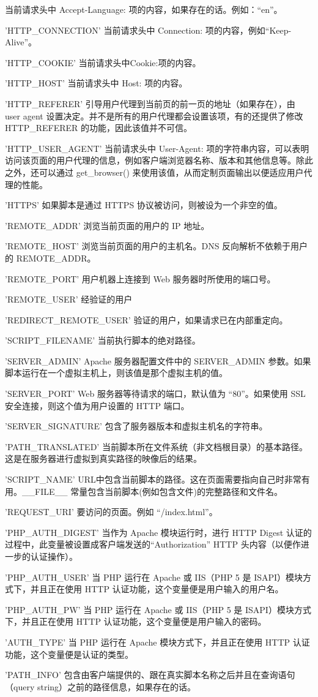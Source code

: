 \begin{compactitem}
当前请求头中 Accept-Language: 项的内容，如果存在的话。例如：“en”。
\item 'HTTP\_CONNECTION'
当前请求头中 Connection: 项的内容，例如“Keep-Alive”。
\item 'HTTP\_COOKIE'
当前请求头中Cookie:项的内容。
\item 'HTTP\_HOST'
当前请求头中 Host: 项的内容。
\item 'HTTP\_REFERER'
引导用户代理到当前页的前一页的地址（如果存在），由 user agent 设置决定。并不是所有的用户代理都会设置该项，有的还提供了修改 HTTP\_REFERER 的功能，因此该值并不可信。
\item 'HTTP\_USER\_AGENT'
当前请求头中 User-Agent: 项的字符串内容，可以表明访问该页面的用户代理的信息，例如客户端浏览器名称、版本和其他信息等。除此之外，还可以通过 get\_browser() 来使用该值，从而定制页面输出以便适应用户代理的性能。
\item 'HTTPS'
如果脚本是通过 HTTPS 协议被访问，则被设为一个非空的值。
\item 'REMOTE\_ADDR'
浏览当前页面的用户的 IP 地址。
\item 'REMOTE\_HOST'
浏览当前页面的用户的主机名。DNS 反向解析不依赖于用户的 REMOTE\_ADDR。
\item 'REMOTE\_PORT'
用户机器上连接到 Web 服务器时所使用的端口号。
\item 'REMOTE\_USER'
经验证的用户
\item 'REDIRECT\_REMOTE\_USER'
验证的用户，如果请求已在内部重定向。
\item 'SCRIPT\_FILENAME'
当前执行脚本的绝对路径。
\item 'SERVER\_ADMIN'
Apache 服务器配置文件中的 SERVER\_ADMIN 参数。如果脚本运行在一个虚拟主机上，则该值是那个虚拟主机的值。
\item 'SERVER\_PORT'
Web 服务器等待请求的端口，默认值为 “80”。如果使用 SSL 安全连接，则这个值为用户设置的 HTTP 端口。
\item 'SERVER\_SIGNATURE'
包含了服务器版本和虚拟主机名的字符串。
\item 'PATH\_TRANSLATED'
当前脚本所在文件系统（非文档根目录）的基本路径。这是在服务器进行虚拟到真实路径的映像后的结果。
\item 'SCRIPT\_NAME'
URL中包含当前脚本的路径。这在页面需要指向自己时非常有用。\_\_FILE\_\_ 常量包含当前脚本(例如包含文件)的完整路径和文件名。
\item 'REQUEST\_URI'
要访问的页面。例如 “/index.html”。
\item 'PHP\_AUTH\_DIGEST'
当作为 Apache 模块运行时，进行 HTTP Digest 认证的过程中，此变量被设置成客户端发送的“Authorization” HTTP 头内容（以便作进一步的认证操作）。
\item 'PHP\_AUTH\_USER'
当 PHP 运行在 Apache 或 IIS（PHP 5 是 ISAPI）模块方式下，并且正在使用 HTTP 认证功能，这个变量便是用户输入的用户名。
\item 'PHP\_AUTH\_PW'
当 PHP 运行在 Apache 或 IIS（PHP 5 是 ISAPI）模块方式下，并且正在使用 HTTP 认证功能，这个变量便是用户输入的密码。
\item 'AUTH\_TYPE'
当 PHP 运行在 Apache 模块方式下，并且正在使用 HTTP 认证功能，这个变量便是认证的类型。
\item 'PATH\_INFO'
包含由客户端提供的、跟在真实脚本名称之后并且在查询语句（query string）之前的路径信息，如果存在的话。


\end{compactitem}
